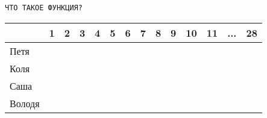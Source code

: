 \documentclass[11pt, a4paper]{article}
\begin{document}
\vspace*{-3em}  \centerline{\texttt{ЧТО ТАКОЕ ФУНКЦИЯ?}}
\vspace*{0.8em}
\begin{multicols*}{2}
\begin{center}
\begin{tabular}{ |m{1.2cm} *{13}{|m{0.2cm}}| } 
  \hline
  & 1 & 2 & 3& 4 & 5 & 6 & 7 & 8 & 9 & 10 & 11 & ... & 28\\ 
  \hline
  Петя &&&&&&&&&&&&&\\ 
  \hline
  Коля &&&&&&&&&&&&&\\ 
  \hline
  Саша &&&&&&&&&&&&& \\ 
  \hline
   Володя &&&&&&&&&&&&& \\ 
  \hline
\end{tabular}
\end{center}
\end{multicols*}
\end{document}
